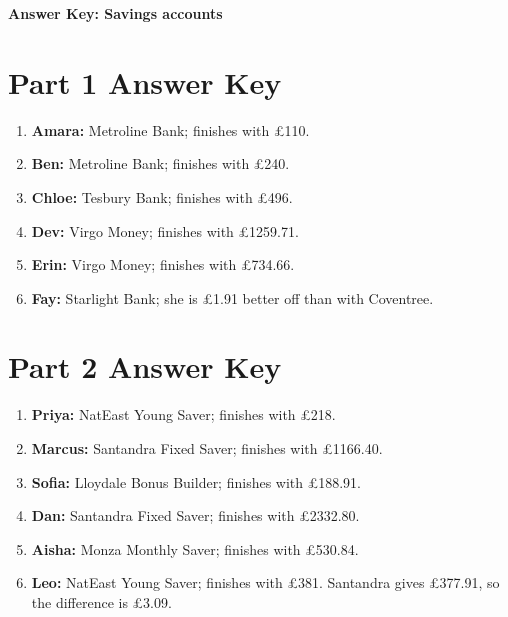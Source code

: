 \documentclass[12pt]{article}
\begin{document}
\begin{center}
  {\LARGE\bfseries Answer Key: Savings accounts}
\end{center}

\section*{Part 1 Answer Key}

\begin{enumerate}[label=\textbf{\arabic*.}, leftmargin=4mm, itemsep=3mm, topsep=2mm]

\item \textbf{Amara:} Metroline Bank; finishes with \pounds110.

\item \textbf{Ben:} Metroline Bank; finishes with \pounds240.

\item \textbf{Chloe:} Tesbury Bank; finishes with \pounds496.

\item \textbf{Dev:} Virgo Money; finishes with \pounds1259.71.

\item \textbf{Erin:} Virgo Money; finishes with \pounds734.66.

\item \textbf{Fay:} Starlight Bank; she is \pounds1.91 better off than with Coventree.

\end{enumerate}

\section*{Part 2 Answer Key}

\begin{enumerate}[label=\textbf{\arabic*.}, leftmargin=4mm, itemsep=3mm, topsep=2mm]

\item \textbf{Priya:} NatEast Young Saver; finishes with \pounds218.

\item \textbf{Marcus:} Santandra Fixed Saver; finishes with \pounds1166.40.

\item \textbf{Sofia:} Lloydale Bonus Builder; finishes with \pounds188.91.

\item \textbf{Dan:} Santandra Fixed Saver; finishes with \pounds2332.80.

\item \textbf{Aisha:} Monza Monthly Saver; finishes with \pounds530.84.

\item \textbf{Leo:} NatEast Young Saver; finishes with \pounds381. Santandra gives \pounds377.91, so the difference is \pounds3.09.

\end{enumerate}
\end{document}
